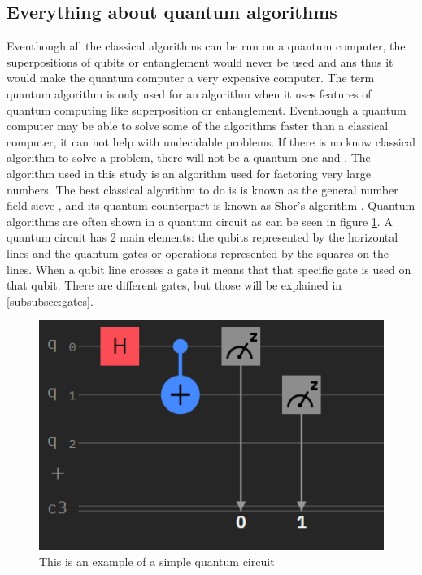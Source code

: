 \subsection{Everything about quantum algorithms}
Eventhough all the classical algorithms can be run on a quantum computer, the superpositions of qubits or entanglement would never be used \autocite{qalgo} and \autocite{quantumalgo} ans thus it would make the quantum computer a very expensive computer.
The term quantum algorithm is only used for an algorithm when it uses features of quantum computing like superposition or entanglement.
Eventhough a quantum computer may be able to solve some of the algorithms faster than a classical computer, it can not help with undecidable problems. If there is no know classical algorithm to solve a problem, there will not be a quantum one \autocite{undecidable} and \autocite{quantumalgo}.
The algorithm used in this study is an algorithm used for factoring very large numbers. The best classical algorithm to do is is known as the general number field sieve \autocite{GNFS}, and its quantum counterpart is known as Shor's algorithm \autocite{Shor}.
Quantum algorithms are often shown in a quantum circuit as can be seen in figure \ref{fig:Quantum circuit}. A quantum circuit has 2 main elements: the qubits represented by the horizontal lines and the quantum gates or operations represented by the squares on the lines.
When a qubit line crosses a gate it means that that specific gate is used on that qubit. There are different gates, but those will be explained in \ref{subsubsec:gates}.

\begin{figure} [h]
    \centering
    \includegraphics[width=\textwidth]{img/circuitVB.PNG}
        \caption{This is an example of a simple quantum circuit}
        \label{fig:Quantum circuit}
\end{figure}

